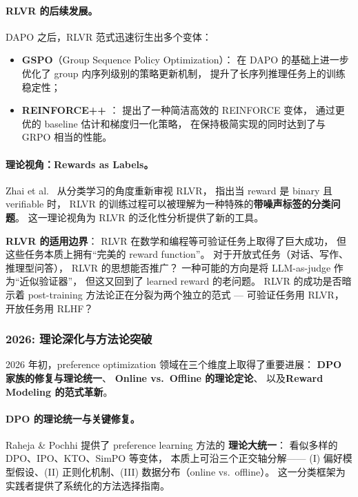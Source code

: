 \paragraph{RLVR 的后续发展。}
DAPO 之后，RLVR 范式迅速衍生出多个变体：
\begin{itemize}[leftmargin=2em]
  \item \textbf{GSPO}（Group Sequence Policy Optimization）\cite{zheng2025gspo}：
    在 DAPO 的基础上进一步优化了 group 内序列级别的策略更新机制，
    提升了长序列推理任务上的训练稳定性；
  \item \textbf{REINFORCE++} \cite{hu2025reinforcepp}：
    提出了一种简洁高效的 REINFORCE 变体，
    通过更优的 baseline 估计和梯度归一化策略，
    在保持极简实现的同时达到了与 GRPO 相当的性能。
\end{itemize}

\paragraph{理论视角：Rewards as Labels。}
Zhai et al.\ \cite{zhai2026real} 从分类学习的角度重新审视 RLVR，
指出当 reward 是 binary 且 verifiable 时，
RLVR 的训练过程可以被理解为一种特殊的\textbf{带噪声标签的分类问题}。
这一理论视角为 RLVR 的泛化性分析提供了新的工具。

\begin{openproblembox}
\textbf{RLVR 的适用边界}：
RLVR 在数学和编程等可验证任务上取得了巨大成功，
但这些任务本质上拥有``完美的 reward function''。
对于开放式任务（对话、写作、推理型问答），
RLVR 的思想能否推广？
一种可能的方向是将 LLM-as-judge 作为``近似验证器''，
但这又回到了 learned reward 的老问题。
RLVR 的成功是否暗示着 post-training 方法论正在分裂为两个独立的范式 ---
可验证任务用 RLVR，开放任务用 RLHF？
\end{openproblembox}

\subsubsection{2026: 理论深化与方法论突破}
\label{sec:t2-2026}

2026 年初，preference optimization 领域在三个维度上取得了重要进展：
\textbf{DPO 家族的修复与理论统一}、
\textbf{Online vs.\ Offline 的理论定论}、
以及\textbf{Reward Modeling 的范式革新}。

\paragraph{DPO 的理论统一与关键修复。}
Raheja \& Pochhi \cite{raheja2026unification} 提供了 preference learning 方法的
\textbf{理论大统一}：
看似多样的 DPO、IPO、KTO、SimPO 等变体，
本质上可沿三个正交轴分解——
(I) 偏好模型假设、(II) 正则化机制、(III) 数据分布（online vs.\ offline）。
这一分类框架为实践者提供了系统化的方法选择指南。

